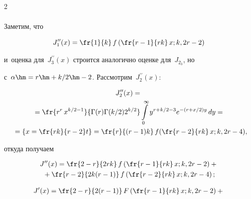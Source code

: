 \begin{multicols}{2}
\begin{multline*}
\end{multline*}





Заметим, что 


$$


J_1^{\prime\prime}(x) = \fr{1}{k}\,f\left( \fr{r-1}{rk}\, x;k,2r-2\right)


$$


и~оценка для~$J_3^{\prime\prime}(x)$ строится аналогично оценке для~$J_{2_3}$, но 


с~$\alpha \hm= r\hm+k/2\hm-2$. Рассмотрим~$J_2^{\prime\prime}(x)$:


\begin{multline*}


J_2^{\prime\prime}(x) ={}\\


{}= \fr{r^r\,x^{k/2-1}}{\Gamma(r)\Gamma(k/2)2^{k/2}}\int\limits^{\infty}_{0} y^{r+k/2-3}


e^{-(r+x/2)y}\,dy ={} \\


{}= \left\{  x = \fr{rk}{r-2}t \right\} = \fr{r}{(r-1)k}\,f\!\left( \fr{r-2}{rk}\,x;k,2r-4\right)\!,\hspace*{-3.6227pt}


\end{multline*}


откуда получаем


\begin{multline}


\label{j401}


 J^{\prime\prime}(x) =  \fr{2-r}{2rk} \,f\left( \fr{r-1}{rk}\,x;k,2r-2\right) +{}\\


 {}+ \fr{r-2}{2k(r-1)}\,f\left( \fr{r-2}{rk}\, x;k,2r-4\right);


\end{multline}





\vspace*{-12pt}





\noindent


\begin{multline}


\label{j402}


 J^{\prime}(x) =  \fr{2-r}{2(r-1)}\, F\left( \fr{r-1}{rk}\, x;k,2r-2\right) + {}\\



\end{multline}
\end{multicols}
